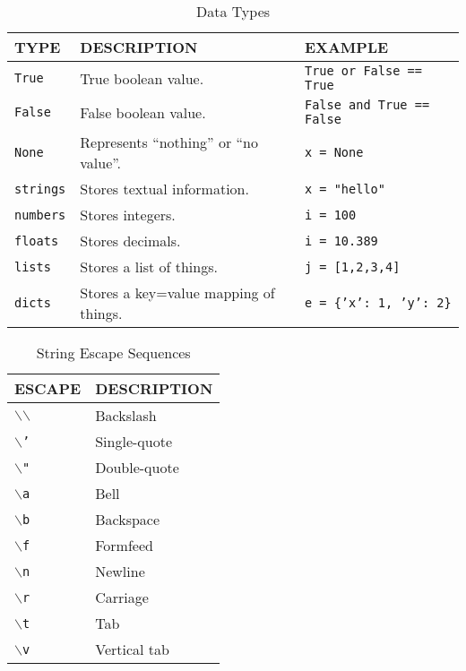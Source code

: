     \begin{table}[htbp]
      \begin{minipage}{\linewidth}
      \setlength{\tymax}{0.5\linewidth}
      \centering
      \small
    \caption{Data Types}
    \label{datatypes}
      \begin{tabulary}{\textwidth}{@{}LLL@{}} \toprule
    TYPE&DESCRIPTION&EXAMPLE\\
      \midrule
    \texttt{True}&True boolean value.&\texttt{True or False == True}\\
    \texttt{False}&False boolean value.&\texttt{False and True == False}\\
    \texttt{None}&Represents ``nothing'' or ``no value''.&\texttt{x = None}\\
    \texttt{strings}&Stores textual information.&\texttt{x = "hello"}\\
    \texttt{numbers}&Stores integers.&\texttt{i = 100}\\
    \texttt{floats}&Stores decimals.&\texttt{i = 10.389}\\
    \texttt{lists}&Stores a list of things.&\texttt{j = [1,2,3,4]}\\
    \texttt{dicts}&Stores a key=value mapping of things.&\texttt{e = \{'x': 1, 'y': 2\}}\\
    
    \bottomrule

  \end{tabulary}
      \end{minipage}
      \end{table}


    \begin{table}[htbp]
      \begin{minipage}{\linewidth}
      \setlength{\tymax}{0.5\linewidth}
      \centering
      \small
    \caption{String Escape Sequences}
    \label{stringescapesequences}
      \begin{tabulary}{\textwidth}{@{}LL@{}} \toprule
    ESCAPE&DESCRIPTION\\
      \midrule
    \texttt{$\backslash$$\backslash$}&Backslash\\
    \texttt{$\backslash$'}&Single-quote\\
    \texttt{$\backslash$"}&Double-quote\\
    \texttt{$\backslash$a}&Bell\\
    \texttt{$\backslash$b}&Backspace\\
    \texttt{$\backslash$f}&Formfeed\\
    \texttt{$\backslash$n}&Newline\\
    \texttt{$\backslash$r}&Carriage\\
    \texttt{$\backslash$t}&Tab\\
    \texttt{$\backslash$v}&Vertical tab\\
    
    \bottomrule

  \end{tabulary}
      \end{minipage}
      \end{table}


